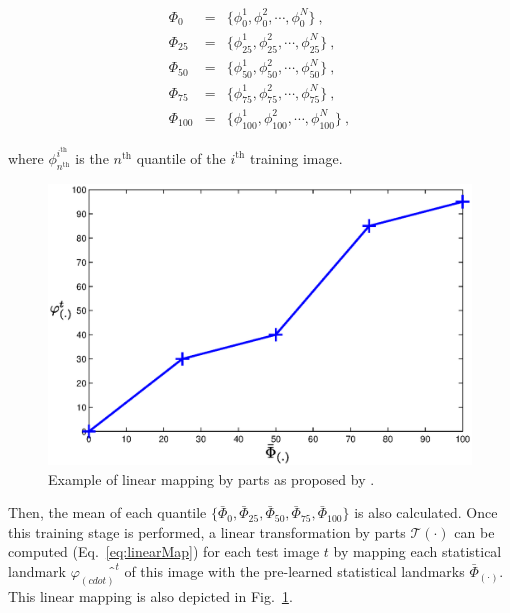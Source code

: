 \begin{eqnarray}	
	\Phi_{0} & = & \{ \phi_{0}^{1}, \phi_{0}^{2}, \cdots, \phi_{0}^{N} \} \ , \nonumber \\
	\Phi_{25} & = & \{ \phi_{25}^{1}, \phi_{25}^{2}, \cdots, \phi_{25}^{N} \} \ , \nonumber \\
	\Phi_{50} & = & \{ \phi_{50}^{1}, \phi_{50}^{2}, \cdots, \phi_{50}^{N} \} \ ,  \label{eq:quantileStd} \\
	\Phi_{75} & = & \{ \phi_{75}^{1}, \phi_{75}^{2}, \cdots, \phi_{75}^{N} \} \ , \nonumber \\
	\Phi_{100} & = & \{ \phi_{100}^{1}, \phi_{100}^{2}, \cdots, \phi_{100}^{N} \} \ , \nonumber
\end{eqnarray}

\noindent where $\phi_{n^\text{th}}^{i^{\text{th}}}$ is the $n^{\text{th}}$ quantile of the $i^{\text{th}}$ training image.

\begin{figure}
	\centering
	\includegraphics[width=0.7\linewidth]{3_review/figures/processing/pre-processing/normalization/linear_transform_parts.eps}
	\caption{Example of linear mapping by parts as proposed by \cite{Nyul2000}.}
	\label{fig:imnorm}
\end{figure}

Then, the mean of each quantile $\{ \bar{\Phi}_{0}, \bar{\Phi}_{25}, \bar{\Phi}_{50}, \bar{\Phi}_{75}, \bar{\Phi}_{100} \}$ is also calculated.
Once this training stage is performed, a linear transformation by parts $\mathcal{T}(\cdot)$ can be computed (Eq.~\eqref{eq:linearMap}) for each test image $t$ by mapping each statistical landmark $\varphi_{(cdot)}̂^{t}$ of this image with the pre-learned statistical landmarks $\bar{\Phi}_{(\cdot)}$.
This linear mapping is also depicted in Fig.~\ref{fig:imnorm}.

